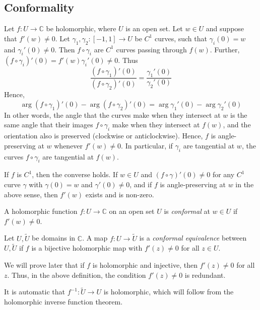 \subsection{Conformality}
Let \( f \colon U \to \mathbb C \) be holomorphic, where \( U \) is an open set.
Let \( w \in U \) and suppose that \( f'(w) \neq 0 \).
Let \( \gamma_1, \gamma_2 \colon [-1, 1] \to U \) be \( C^1 \) curves, such that \( \gamma_i(0) = w \) and \( \gamma_i'(0) \neq 0 \).
Then \( f \circ \gamma_i \) are \( C^1 \) curves passing through \( f(w) \).
Further, \( (f \circ \gamma_i)'(0) = f'(w) \gamma_i'(0) \neq 0 \).
Thus
\[
	\frac{(f \circ \gamma_1)'(0)}{(f \circ \gamma_2)'(0)} = \frac{\gamma_1'(0)}{\gamma_2'(0)}
\]
Hence,
\[
	\arg(f \circ \gamma_1)'(0) - \arg(f \circ \gamma_2)'(0) = \arg \gamma_1'(0) - \arg \gamma_2'(0)
\]
In other words, the angle that the curves make when they intersect at \( w \) is the same angle that their images \( f \circ \gamma_i \) make when they intersect at \( f(w) \), and the orientation also is preserved (clockwise or anticlockwise).
Hence, \( f \) is angle-preserving at \( w \) whenever \( f'(w) \neq 0 \).
In particular, if \( \gamma_i \) are tangential at \( w \), the curves \( f \circ \gamma_i \) are tangential at \( f(w) \).
\begin{remark}
	If \( f \) is \( C^1 \), then the converse holds.
	If \( w \in U \) and \( (f \circ \gamma)'(0) \neq 0 \) for any \( C^1 \) curve \( \gamma \) with \( \gamma(0) = w \) and \( \gamma'(0) \neq 0 \), and if \( f \) is angle-preserving at \( w \) in the above sense, then \( f'(w) \) exists and is non-zero.
\end{remark}
\begin{definition}
	A holomorphic function \( f \colon U \to \mathbb C \) on an open set \( U \) is \textit{conformal} at \( w \in U \) if \( f'(w) \neq 0 \).
\end{definition}
\begin{definition}
	Let \( U, \widetilde U \) be domains in \( \mathbb C \).
	A map \( f \colon U \to \widetilde U \) is a \textit{conformal equivalence} between \( U, \widetilde U \) if \( f \) is a bijective holomorphic map with \( f'(z) \neq 0 \) for all \( z \in U \).
\end{definition}
\begin{remark}
	We will prove later that if \( f \) is holomorphic and injective, then \( f'(z) \neq 0 \) for all \( z \).
	Thus, in the above definition, the condition \( f'(z) \neq 0 \) is redundant.
\end{remark}
\begin{remark}
	It is automatic that \( f^{-1} \colon \widetilde U \to U \) is holomorphic, which will follow from the holomorphic inverse function theorem.
\end{remark}
